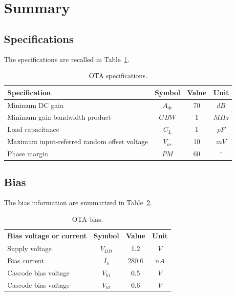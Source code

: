 \documentclass[
  a4paper,
  DIV=11,
  numbers=noendperiod]{scrreprt}
\begin{document}
\section{Summary}\label{summary}

\subsection{Specifications}\label{specifications-1}

The specifications are recalled in Table~\ref{tbl-ota_specs2}.

\begin{longtable}[]{@{}lccc@{}}

\caption{\label{tbl-ota_specs2}OTA specifications.}

\tabularnewline

\toprule\noalign{}
Specification & Symbol & Value & Unit \\
\midrule\noalign{}
\endhead
\bottomrule\noalign{}
\endlastfoot
Minimum DC gain & \(A_{{dc}}\) & 70 & \(dB\) \\
Minimum gain-bandwidth product & \(GBW\) & 1 & \(MHz\) \\
Load capacitance & \(C_L\) & 1 & \(pF\) \\
Maximum input-referred random offset voltage & \(V_{{os}}\) & 10 &
\(mV\) \\
Phase margin & \(PM\) & 60 & \(^{\circ}\) \\

\end{longtable}

\subsection{Bias}\label{bias}

The bias information are summarized in Table~\ref{tbl-ota_bias}.

\begin{longtable}[]{@{}lccc@{}}

\caption{\label{tbl-ota_bias}OTA bias.}

\tabularnewline

\toprule\noalign{}
Bias voltage or current & Symbol & Value & Unit \\
\midrule\noalign{}
\endhead
\bottomrule\noalign{}
\endlastfoot
Supply voltage & \(V_{{DD}}\) & 1.2 & \(V\) \\
Bias current & \(I_b\) & 280.0 & \(nA\) \\
Cascode bias voltage & \(V_{{b1}}\) & 0.5 & \(V\) \\
Cascode bias voltage & \(V_{{b2}}\) & 0.6 & \(V\) \\

\end{longtable}
\end{document}
